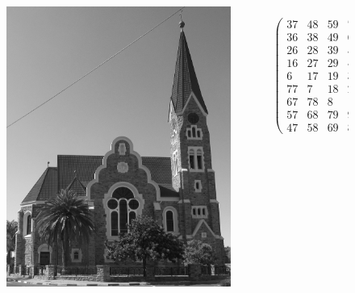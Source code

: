 \documentclass{beamer}
\begin{document}
\begin{frame}
\begin{figure}
    \begin{columns}
  \begin{column}{0.45\textwidth}
    \begin{center}
    \includegraphics[width=0.9\textwidth]{testimage.jpg}
    \end{center}
  \end{column}
  \begin{column}{0.55\textwidth}
    \scriptsize{
    \begin{equation*}
    \begin{pmatrix}
      37 & 48 & 59 & 70 & 81 & 2 & 13 & 24 & 35 \\
      36 & 38 & 49 & 60 & 71 & 73 & 3 & 14 & 25 \\
      26 & 28 & 39 & 50 & 61 & 72 & 74 & 4 & 15 \\
      16 & 27 & 29 & 40 & 51 & 62 & 64 & 75 & 5 \\
      6 & 17 & 19 & 30 & 41 & 52 & 63 & 65 & 76 \\
      77 & 7 & 18 & 20 & 31 & 42 & 53 & 55 & 66 \\
      67 & 78 & 8 & 10 & 21 & 32 & 43 & 54 & 56 \\
      57 & 68 & 79 & 9 & 11 & 22 & 33 & 44 & 46 \\
      47 & 58 & 69 & 80 & 1 & 12 & 23 & 34 & 45
    \end{pmatrix}
    \end{equation*}
    }
  \end{column}
  \end{columns}
\end{figure}
\end{frame}
\end{document}
